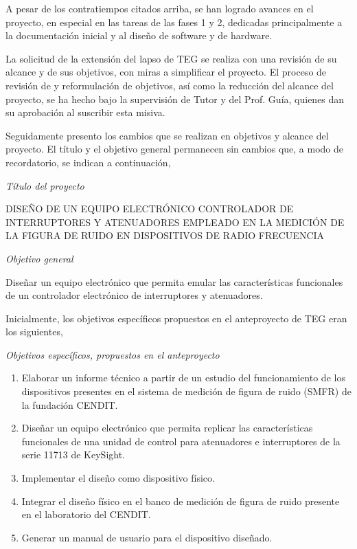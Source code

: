 \documentclass[paper=letter,oneside,fontsize=12pt, parskip=full]{article}
\begin{document}
	A pesar de los contratiempos citados arriba, se han logrado avances en el proyecto, en especial en las tareas de las fases 1 y 2, dedicadas principalmente a la documentación inicial y al diseño de software y de hardware. 
	
	La solicitud de la extensión del lapso de TEG se realiza con una revisión de su alcance y de sus objetivos, con miras a simplificar el proyecto. El proceso de revisión de y reformulación de objetivos, así como la reducción del alcance del proyecto, se ha hecho bajo la supervisión de Tutor y del Prof. Guía, quienes dan su aprobación al suscribir esta misiva. 
	
	Seguidamente presento los cambios que se realizan en objetivos y alcance del proyecto. El título y el objetivo general permanecen sin cambios que, a modo de recordatorio, se indican a continuación,	
	
	\emph{Título del proyecto}

	\begin{minipage}{0.95\textwidth}
		\centering
		DISEÑO DE UN EQUIPO ELECTRÓNICO CONTROLADOR DE INTERRUPTORES Y ATENUADORES EMPLEADO EN LA MEDICIÓN DE LA FIGURA DE RUIDO EN DISPOSITIVOS DE RADIO FRECUENCIA
	\end{minipage}

	\emph{Objetivo general}
	
	\hfill%
	\begin{minipage}{0.95\textwidth}
		Diseñar un equipo electrónico que permita emular las características funcionales de un controlador electrónico de interruptores y atenuadores.
	\end{minipage}
	
	Inicialmente, los objetivos específicos propuestos en el anteproyecto de TEG eran los siguientes,
	
	\emph{Objetivos específicos, propuestos en el anteproyecto}
	
	\begin{enumerate}
		\item Elaborar un informe técnico a partir de un estudio del funcionamiento de los dispositivos presentes en el sistema de medición de figura de ruido (SMFR) de la fundación CENDIT.
		
		\item Diseñar un equipo electrónico que permita replicar las características funcionales de	una unidad de control para atenuadores e interruptores de la serie 11713 de KeySight.
		
		\item Implementar el diseño como dispositivo físico.
		
		\item Integrar el diseño físico en el banco de medición de figura de ruido presente en el laboratorio del CENDIT.
		
		\item Generar un manual de usuario para el dispositivo diseñado.
	\end{enumerate}	
	
\end{document}
